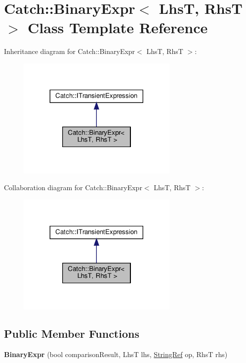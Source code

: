 \hypertarget{classCatch_1_1BinaryExpr}{}\section{Catch\+::Binary\+Expr$<$ LhsT, RhsT $>$ Class Template Reference}
\label{classCatch_1_1BinaryExpr}


Inheritance diagram for Catch\+::Binary\+Expr$<$ LhsT, RhsT $>$\+:\nopagebreak
\begin{figure}[H]
\begin{center}
\leavevmode
\includegraphics[width=221pt]{classCatch_1_1BinaryExpr__inherit__graph}
\end{center}
\end{figure}


Collaboration diagram for Catch\+::Binary\+Expr$<$ LhsT, RhsT $>$\+:\nopagebreak
\begin{figure}[H]
\begin{center}
\leavevmode
\includegraphics[width=221pt]{classCatch_1_1BinaryExpr__coll__graph}
\end{center}
\end{figure}
\subsection*{Public Member Functions}
\begin{DoxyCompactItemize}
\item 
\mbox{\label{classCatch_1_1BinaryExpr_a657d66346aef97a760c22776fe6008b6}} 
{\bfseries Binary\+Expr} (bool comparison\+Result, LhsT lhs, \mbox{\hyperlink{classCatch_1_1StringRef}{String\+Ref}} op, RhsT rhs)
\end{DoxyCompactItemize}
